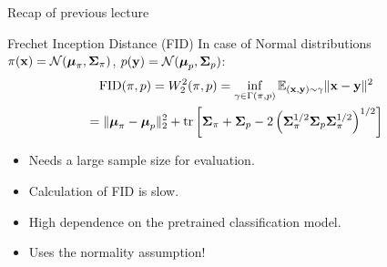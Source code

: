 \begin{frame}{Recap of previous lecture}
	\vspace{-0.3cm}
	\begin{block}{Frechet Inception Distance (FID)}
		In case of Normal distributions $\pi(\mathbf{x}) = \mathcal{N}(\boldsymbol{\mu}_\pi, \boldsymbol{\Sigma}_\pi)$, $p(\mathbf{y}) = \mathcal{N}(\boldsymbol{\mu}_p, \boldsymbol{\Sigma}_p)$:
		\vspace{-0.3cm}
		\begin{multline*}
			\text{FID} (\pi, p) =  W_2^2(\pi, p) = \inf_{\gamma \in \Gamma(\pi, p)} \mathbb{E}_{(\mathbf{x}, \mathbf{y}) \sim \gamma} \| \mathbf{x} - \mathbf{y} \|^2 \\
			= \| \boldsymbol{\mu}_{\pi} - \boldsymbol{\mu}_{p}\|_2^2 + \text{tr} \left[ \boldsymbol{\Sigma}_{\pi} + \boldsymbol{\Sigma}_p - 2 \left(\boldsymbol{\Sigma}_{\pi}^{1/2} \boldsymbol{\Sigma}_p \boldsymbol{\Sigma}_{\pi}^{1/2} \right)^{1/2} \right]
		\end{multline*}
		\vspace{-0.6cm}
	\end{block}
	\begin{itemize}
		\item Needs a large sample size for evaluation.
		\item Calculation of FID is slow.
		\item High dependence on the pretrained classification model.
		\item Uses the normality assumption!
	\end{itemize}
\end{frame}
